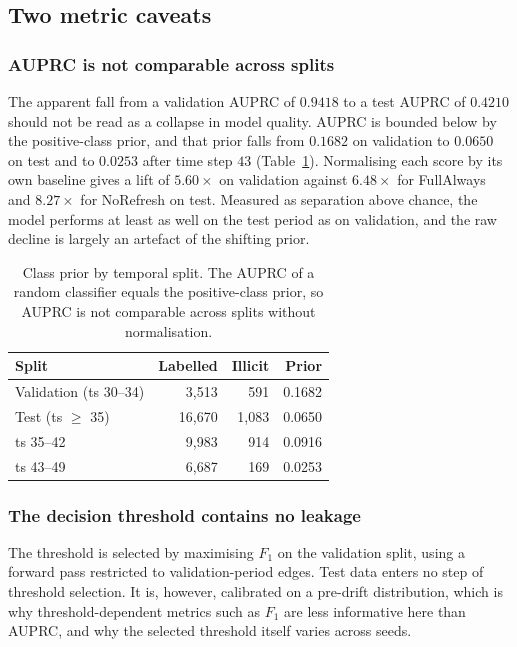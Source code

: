 \documentclass[conference]{IEEEtran}
\begin{document}
\subsection{Two metric caveats}

\subsubsection{AUPRC is not comparable across splits}
The apparent fall from a validation AUPRC of $0.9418$ to a test AUPRC of
$0.4210$ should not be read as a collapse in model quality. AUPRC is bounded
below by the positive-class prior, and that prior falls from $0.1682$ on
validation to $0.0650$ on test and to $0.0253$ after time step $43$
(Table~\ref{tab:prior}). Normalising each score by its own baseline gives a
lift of $5.60\times$ on validation against $6.48\times$ for FullAlways and
$8.27\times$ for NoRefresh on test. Measured as separation above chance, the
model performs at least as well on the test period as on validation, and the
raw decline is largely an artefact of the shifting prior.

\begin{table}[t]
\centering
\caption{Class prior by temporal split. The AUPRC of a random classifier equals
the positive-class prior, so AUPRC is not comparable across splits without
normalisation.}
\label{tab:prior}
\begin{tabular}{lrrr}
\toprule
Split & Labelled & Illicit & Prior \\
\midrule
Validation (ts 30--34) & 3{,}513  & 591     & 0.1682 \\
Test (ts $\geq$ 35)    & 16{,}670 & 1{,}083 & 0.0650 \\
\quad ts 35--42        & 9{,}983  & 914     & 0.0916 \\
\quad ts 43--49        & 6{,}687  & 169     & 0.0253 \\
\bottomrule
\end{tabular}
\end{table}

\subsubsection{The decision threshold contains no leakage}
The threshold is selected by maximising $F_1$ on the validation split, using a
forward pass restricted to validation-period edges. Test data enters no step of
threshold selection. It is, however, calibrated on a pre-drift distribution,
which is why threshold-dependent metrics such as $F_1$ are less informative
here than AUPRC, and why the selected threshold itself varies across seeds.
\end{document}
